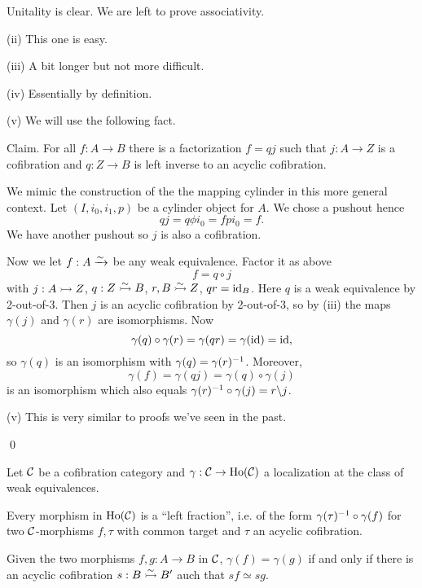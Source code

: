 

Unitality is clear. We are left to prove associativity.

\medskip
{}
\medskip

(ii) This one is easy.

\medskip
{}
\medskip

(iii) A bit longer but not more difficult.

\medskip
{}
\medskip

(iv) Essentially by definition.

(v) We will use the following fact.

Claim. For all $f:A\to B$ there is a factorization $f=qj$ such that $j:A\to Z$ is a cofibration and $q:Z\to B$ is left inverse to an acyclic cofibration.

\begin{claimproof}
We mimic the construction of the the mapping cylinder in this more general context. Let $(I,i_0,i_1,p)$ be a cylinder object for $A$. We chose a pushout
\medskip
{}
\smallskip\noindent
hence
\[qj=q\phi i_0=fpi_0=f.\]
We have another pushout
\medskip
{}
\smallskip\noindent
so $j$ is also a cofibration.
\end{claimproof}

Now we let $f:A\xrightarrow{\sim}$ be any weak equivalence. Factor it as above
\[f=q\circ j\]
with $j:A\rightarrowtail Z$, $q:Z\acco B$, $r,B\acco Z$, $qr=\operatorname{id}_B$. Here $q$ is a weak equivalence by 2-out-of-3. Then $j$ is an acyclic cofibration by 2-out-of-3, so by (iii) the maps $\gamma(j)$ and $\gamma(r)$ are isomorphisms. Now
\[\gamma(q)\circ\gamma(r)=\gamma(qr)=\gamma(\operatorname{id})=\operatorname{id},\]
so $\gamma(q)$ is an isomorphism with $\gamma(q)=\gamma(r)^{-1}$. Moreover,
\[\gamma(f)=\gamma(qj)=\gamma(q)\circ\gamma(j)\]
is an isomorphism which also equals $\gamma(r)^{-1}\circ\gamma(j)=r\backslash j$.

(v) This is very similar to proofs we've seen in the past.

\medskip
{}
\smallskip

\qed

\begin{corollary}\label{corollary:homotopy-category-has-calculus-of-fractions}
Let $\mathcal{C}$ be a cofibration category and $\gamma:\mathcal{C}\to\operatorname{Ho}(\mathcal{C})$ a localization at the class of weak equivalences.
\begin{rmnumerate}
    \item Every morphism in $\operatorname{Ho}(\mathcal{C})$ is a \enquote{left fraction}, i.e. of the form $\gamma(\tau)^{-1}\circ\gamma(f)$ for two $\mathcal{C}$-morphisms $f,\tau$ with common target and $\tau$ an acyclic cofibration.
    \item Given the two morphisms $f,g:A\to B$ in $\mathcal{C}$, $\gamma(f)=\gamma(g)$ if and only if there is an acyclic cofibration $s:B\acco B'$ auch that $sf\simeq sg$.
\end{rmnumerate}
\end{corollary}

